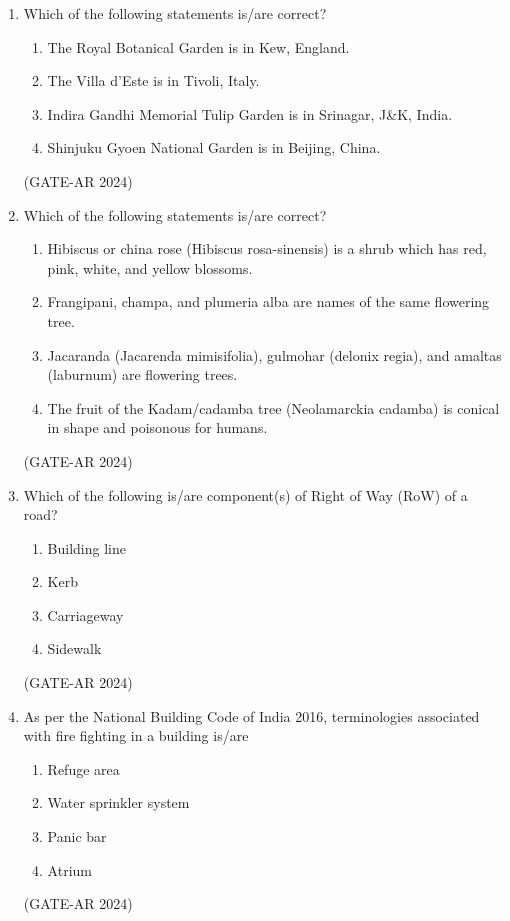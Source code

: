 \documentclass[a4paper,10pt]{article}
\begin{document}
\begin{enumerate}
    \item Which of the following statements is/are correct?
    \begin{enumerate}
        \item The Royal Botanical Garden is in Kew, England.
        \item The Villa d'Este is in Tivoli, Italy.
        \item Indira Gandhi Memorial Tulip Garden is in Srinagar, J\&K, India.
        \item Shinjuku Gyoen National Garden is in Beijing, China.
    \end{enumerate}
    \hfill (GATE-AR 2024)

    \item Which of the following statements is/are correct?
    \begin{enumerate}
        \item Hibiscus or china rose (Hibiscus rosa-sinensis) is a shrub which has red, pink, white, and yellow blossoms.
        \item Frangipani, champa, and plumeria alba are names of the same flowering tree.
        \item Jacaranda (Jacarenda mimisifolia), gulmohar (delonix regia), and amaltas (laburnum) are flowering trees.
        \item The fruit of the Kadam/cadamba tree (Neolamarckia cadamba) is conical in shape and poisonous for humans.
    \end{enumerate}
    \hfill (GATE-AR 2024)

    \item Which of the following is/are component(s) of Right of Way (RoW) of a road?
    \begin{multicols}{4}
    \begin{enumerate}
        \item Building line
        \item Kerb
        \item Carriageway
        \item Sidewalk
    \end{enumerate}
    \end{multicols}
    \hfill (GATE-AR 2024)

    \item As per the National Building Code of India 2016, terminologies associated with fire fighting in a building is/are
    \begin{multicols}{2}
    \begin{enumerate}
        \item Refuge area
        \item Water sprinkler system
        \item Panic bar
        \item Atrium
    \end{enumerate}
    \end{multicols}
    \hfill (GATE-AR 2024)


\end{enumerate}
\end{document}
